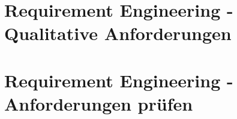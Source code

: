 \documentclass[a4paper]{article}
\begin{document}
\newpage

	\section{Requirement Engineering - Qualitative Anforderungen}
	
	
	
	
	
\newpage

	\section{Requirement Engineering - Anforderungen prüfen}
	
	
	
	
	
	
	
\end{document}
